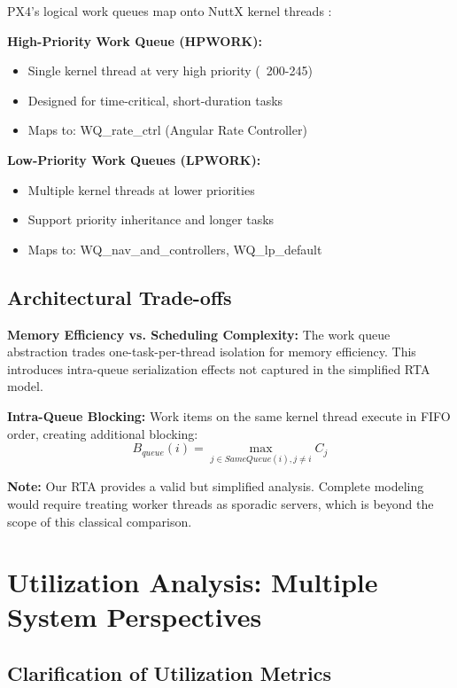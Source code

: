 \documentclass[12pt,a4paper]{article}
\begin{document}
PX4's logical work queues map onto NuttX kernel threads \cite{nuttx}:

\textbf{High-Priority Work Queue (HPWORK):}
\begin{itemize}
\item Single kernel thread at very high priority (~200-245)
\item Designed for time-critical, short-duration tasks
\item Maps to: WQ\_rate\_ctrl (Angular Rate Controller)
\end{itemize}

\textbf{Low-Priority Work Queues (LPWORK):}
\begin{itemize}
\item Multiple kernel threads at lower priorities
\item Support priority inheritance and longer tasks
\item Maps to: WQ\_nav\_and\_controllers, WQ\_lp\_default
\end{itemize}

\subsection{Architectural Trade-offs}

\textbf{Memory Efficiency vs. Scheduling Complexity:}
The work queue abstraction trades one-task-per-thread isolation for memory efficiency. This introduces intra-queue serialization effects not captured in the simplified RTA model.

\textbf{Intra-Queue Blocking:} Work items on the same kernel thread execute in FIFO order, creating additional blocking:
\begin{equation}
B_{queue}(i) = \max_{j \in SameQueue(i), j \neq i} C_j
\end{equation}

\textbf{Note:} Our RTA provides a valid but simplified analysis. Complete modeling would require treating worker threads as sporadic servers, which is beyond the scope of this classical comparison.

\section{Utilization Analysis: Multiple System Perspectives}

\subsection{Clarification of Utilization Metrics}
\end{document}
